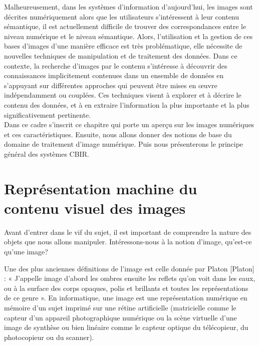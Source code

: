 Malheureusement, dans les systèmes d'information d'aujourd'hui, les images sont décrites numériquement alors que les utilisateurs s'intéressent à leur contenu sémantique, il est actuellement difficile de trouver des correspondances entre le niveau numérique et le niveau sémantique. Alors, l'utilisation et la gestion de ces bases d'images d'une manière efficace est très problématique, elle nécessite de nouvelles techniques de manipulation et de traitement des données. Dans ce contexte, la recherche d'images par le contenu s'intéresse à découvrir des connaissances implicitement contenues dans un ensemble de données en s'appuyant sur différentes approches qui peuvent être mises en œuvre indépendamment ou couplées. Ces techniques visent à explorer et à décrire le contenu des données, et à en extraire l'information la plus importante et la plus significativement pertinente.
%
\\

Dans ce cadre s’inscrit ce chapitre qui porte un aperçu sur les images numériques et ces caractéristiques. Ensuite, nous allons donner des notions de base du domaine de traitement d'image numérique. Puis nous présenterons le principe général des systèmes CBIR.



\section{Représentation machine du contenu visuel des images}

Avant d'entrer dans le vif du sujet, il est important de comprendre la nature des objets que nous allons manipuler. Intéressons-nous à la notion d'image, qu'est-ce qu'une image?

Une des plus anciennes définitions de l'image est celle donnée par Platon [Platon] : « J'appelle image d'abord les ombres ensuite les reflets qu'on voit dans les eaux, ou à la surface des corps opaques, polis et brillants et toutes les représentations de ce genre ». En informatique, une image est une représentation numérique en mémoire d’un sujet imprimé sur une rétine artificielle (matricielle comme le capteur d’un appareil photographique numérique ou la scène virtuelle d’une image de synthèse ou bien linéaire comme le capteur optique du télécopieur, du photocopieur ou du scanner). \\

